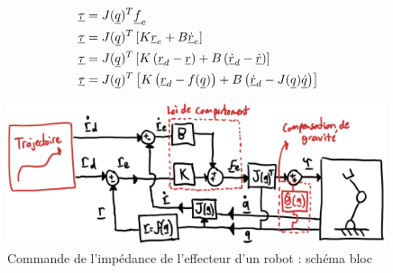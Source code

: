 \begin{align}
	\underline{\tau} &= J(\underline{q})^T \underline{f}_e \\
	\underline{\tau} &= J(\underline{q})^T   \left[ K \underline{r}_e + B \underline{\dot{r}}_e \right] \\
	\underline{\tau} &= J(\underline{q})^T  \left[ K  \left( \underline{r}_d- \underline{r} \right) + B  \left( \underline{\dot{r}}_d - \underline{\dot{r}} \right)  \right] \\
	\underline{\tau} &= J(\underline{q})^T  \left[ K  \left( \underline{r}_d- f(\underline{q}) \right) + B  \left( \underline{\dot{r}}_d - J(\underline{q}) \underline{\dot{q}} \right)  \right]
\end{align}
\begin{figure}[th]
	\centering
	\includegraphics[width=0.99\textwidth]{fig/impedanceeffectorbloc.jpg}
	\caption{Commande de l'impédance de l'effecteur d'un robot : schéma bloc}
	\label{fig:impedanceeffectorbloc}
\end{figure}

